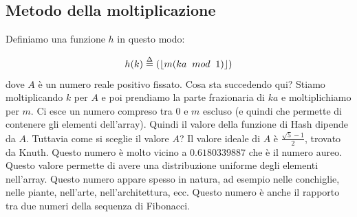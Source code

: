 \documentclass[a4paper]{article}
\begin{document}
\subsection{Metodo della moltiplicazione}

Definiamo una funzione $h$ in questo modo:

\[h(k) \stackrel{\Delta}{=} \left(\floor*{m(ka \; \; mod \; \; 1)}\right) \] 
dove $A$ è un numero reale positivo fissato. Cosa sta succedendo qui? Stiamo moltiplicando $k$ per $A$ e poi prendiamo la parte frazionaria di $ka$ e moltiplichiamo per $m$.
Ci esce un numero compreso tra $0$ e $m$ escluso (e quindi che permette di contenere gli elementi dell'array). Quindi il valore della funzione di Hash dipende da $A$.
Tuttavia come si sceglie il valore $A$? Il valore ideale di $A$ è $\frac{\sqrt{5}-1}{2}$, trovato da Knuth.
Questo numero è molto vicino a $0.6180339887$ che è il numero aureo. Questo valore permette di avere una distribuzione uniforme degli elementi nell'array. Questo numero appare
spesso in natura, ad esempio nelle conchiglie, nelle piante, nell'arte, nell'architettura, ecc. Questo numero è anche il rapporto tra due numeri della sequenza di Fibonacci.
\end{document}
